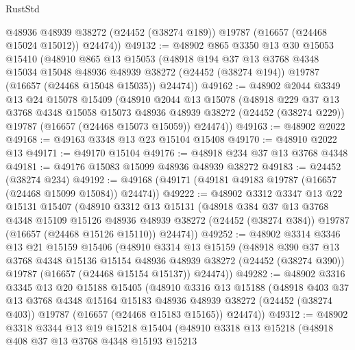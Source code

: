 \begin{lexlean}{RustStd}
\begin{coremodule}
        @48936
        @48939
        @38272
        (@24452 (@38274 @189))
        @19787
        (@16657 (@24468 @15024 @15012))
        @24474))
@49132 := @48902
    @865
    @3350
    @13
    @30
    @15053
    @15410
    (@48910
      @865
      @13
      @15053
      (@48918
        @194
        @37
        @13
        @3768
        @4348
        @15034
        @15048
        @48936
        @48939
        @38272
        (@24452 (@38274 @194))
        @19787
        (@16657 (@24468 @15048 @15035))
        @24474))
@49162 := @48902
    @2044
    @3349
    @13
    @24
    @15078
    @15409
    (@48910
      @2044
      @13
      @15078
      (@48918
        @229
        @37
        @13
        @3768
        @4348
        @15058
        @15073
        @48936
        @48939
        @38272
        (@24452 (@38274 @229))
        @19787
        (@16657 (@24468 @15073 @15059))
        @24474))
@49163 := @48902 @2022
@49168 := @49163 @3348 @13 @23 @15104 @15408
@49170 := @48910 @2022 @13
@49171 := @49170 @15104
@49176 := @48918 @234 @37 @13 @3768 @4348
@49181 := @49176 @15083 @15099 @48936 @48939 @38272
@49183 := @24452 (@38274 @234)
@49192 := @49168 (@49171 (@49181 @49183 @19787 (@16657 (@24468 @15099 @15084)) @24474))
@49222 := @48902
    @3312
    @3347
    @13
    @22
    @15131
    @15407
    (@48910
      @3312
      @13
      @15131
      (@48918
        @384
        @37
        @13
        @3768
        @4348
        @15109
        @15126
        @48936
        @48939
        @38272
        (@24452 (@38274 @384))
        @19787
        (@16657 (@24468 @15126 @15110))
        @24474))
@49252 := @48902
    @3314
    @3346
    @13
    @21
    @15159
    @15406
    (@48910
      @3314
      @13
      @15159
      (@48918
        @390
        @37
        @13
        @3768
        @4348
        @15136
        @15154
        @48936
        @48939
        @38272
        (@24452 (@38274 @390))
        @19787
        (@16657 (@24468 @15154 @15137))
        @24474))
@49282 := @48902
    @3316
    @3345
    @13
    @20
    @15188
    @15405
    (@48910
      @3316
      @13
      @15188
      (@48918
        @403
        @37
        @13
        @3768
        @4348
        @15164
        @15183
        @48936
        @48939
        @38272
        (@24452 (@38274 @403))
        @19787
        (@16657 (@24468 @15183 @15165))
        @24474))
@49312 := @48902
    @3318
    @3344
    @13
    @19
    @15218
    @15404
    (@48910
      @3318
      @13
      @15218
      (@48918
        @408
        @37
        @13
        @3768
        @4348
        @15193
        @15213

\end{coremodule}
\end{lexlean}
